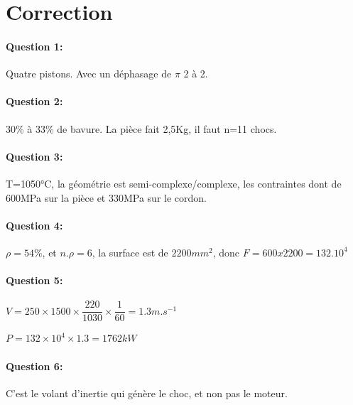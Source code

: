 \pagestyle{correction}

\section{Correction}

\paragraph{Question 1:} Quatre pistons. Avec un déphasage de $\pi$ 2 à 2.

\paragraph{Question 2:} 30\% à 33\% de bavure. La pièce fait 2,5Kg, il faut n=11 chocs.

\paragraph{Question 3:} T=1050°C, la géométrie est semi-complexe/complexe, les contraintes dont de 600MPa sur la pièce et 330MPa sur le cordon.

\paragraph{Question 4:} $\rho=54\%$, et $n.\rho=6$, la surface est de $2200mm^2$, donc $F=600x2200=132.10^4$
  
\paragraph{Question 5:} $V=250\times 1500\times \dfrac{220}{1030}\times \dfrac{1}{60}=1.3m.s^{-1}$

$P=132\times 10^4\times 1.3=1762kW$

\paragraph{Question 6:} C'est le volant d'inertie qui génère le choc, et non pas le moteur.


